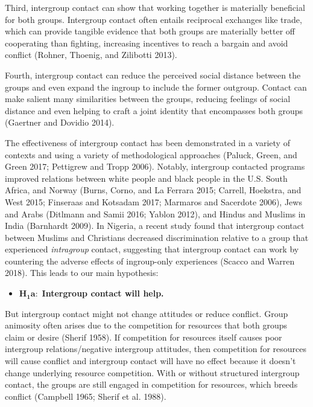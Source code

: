 \documentclass[11pt]{article}
\providecommand{\tightlist}{%
  \setlength{\itemsep}{0pt}\setlength{\parskip}{0pt}}
\begin{document}
Third, intergroup contact can show that working together is materially
beneficial for both groups. Intergroup contact often entails reciprocal
exchanges like trade, which can provide tangible evidence that both
groups are materially better off cooperating than fighting, increasing
incentives to reach a bargain and avoid conflict (Rohner, Thoenig, and
Zilibotti 2013).

Fourth, intergroup contact can reduce the perceived social distance
between the groups and even expand the ingroup to include the former
outgroup. Contact can make salient many similarities between the groups,
reducing feelings of social distance and even helping to craft a joint
identity that encompasses both groups (Gaertner and Dovidio 2014).

The effectiveness of intergroup contact has been demonstrated in a
variety of contexts and using a variety of methodological approaches
(Paluck, Green, and Green 2017; Pettigrew and Tropp 2006). Notably,
intergroup contacted programs improved relations between white people
and black people in the U.S. South Africa, and Norway (Burns, Corno, and
La Ferrara 2015; Carrell, Hoekstra, and West 2015; Finseraas and
Kotsadam 2017; Marmaros and Sacerdote 2006), Jews and Arabs (Ditlmann
and Samii 2016; Yablon 2012), and Hindus and Muslims in India (Barnhardt
2009). In Nigeria, a recent study found that intergroup contact between
Muslims and Christians decreased discrimination relative to a group that
experienced \emph{intragroup} contact, suggesting that intergroup
contact can work by countering the adverse effects of ingroup-only
experiences (Scacco and Warren 2018). This leads to our main hypothesis:

\begin{itemize}
\tightlist
\item
  \(\mathbf{H_1a}:\) \textbf{Intergroup contact will help.} 
\end{itemize}

But intergroup contact might not change attitudes or reduce conflict.
Group animosity often arises due to the competition for resources that
both groups claim or desire (Sherif 1958). If competition for resources
itself causes poor intergroup relations/negative intergroup attitudes,
then competition for resources will cause conflict and intergroup
contact will have no effect because it doesn't change underlying
resource competition. With or without structured intergroup contact, the
groups are still engaged in competition for resources, which breeds
conflict (Campbell 1965; Sherif et al. 1988).
\end{document}
